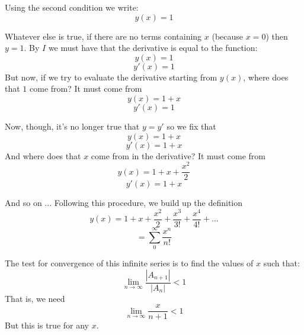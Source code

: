 \documentclass[11pt, oneside]{article}
\begin{document}
Using the second condition we write:
\[ y(x) = 1 \]

Whatever else is true, if there are no terms containing $x$ (because $x=0$) then $y = 1$.  By $I$ we must have that the derivative is equal to the function:
\[ y(x) = 1 \]
\[ y'(x) = 1 \]
But now, if we try to evaluate the derivative starting from $y(x)$, where does that $1$ come from?  It must come from
\[ y(x) = 1 + x \]
\[ y'(x) = 1 \]

Now, though, it's no longer true that $y = y'$ so we fix that
\[ y(x) = 1 + x \]
\[ y'(x) = 1 + x \]
And where does that $x$ come from in the derivative?  It must come from
\[ y(x) = 1 + x + \frac{x^2}{2} \]
\[ y'(x) = 1 + x \]

And so on ...  Following this procedure, we build up the definition
\[ y(x) = 1 + x + \frac{x^2}{2} + \frac{x^3}{3!} + \frac{x^4}{4!} + \dots  \]
\[ = \sum_0^{\infty} \frac{x^n}{n!} \]

The test for convergence of this infinite series is to find the values of $x$ such that:
\[ \lim_{n \rightarrow \infty} \frac{|A_{n+1}|}{|A_n|} < 1 \]
That is, we need
\[ \lim_{n \rightarrow \infty} \frac{x}{n+1} < 1  \]
But this is true for any $x$.
\end{document}

